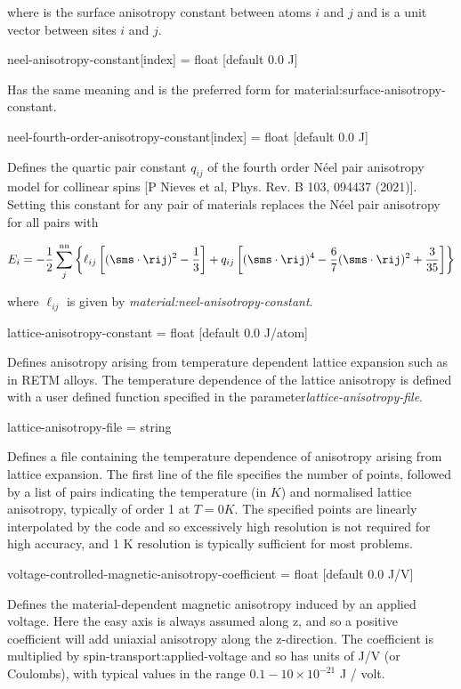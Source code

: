 \noindent where \ksurf is the surface anisotropy constant between atoms $i$ and $j$ and \rij is a unit vector between sites $i$ and $j$.

{\zicf neel-anisotropy-constant[index] = float [default 0.0 J]}
Has the same meaning and is the preferred form for material:surface-anisotropy-constant.

{\zicf neel-fourth-order-anisotropy-constant[index] = float [default 0.0 J]}
Defines the quartic pair constant $q_{ij}$ of the fourth order N\'eel pair anisotropy model for collinear spins [P Nieves et al, Phys. Rev. B 103, 094437 (2021)]. Setting this constant for any pair of materials replaces the N\'eel pair anisotropy for all pairs with

\begin{equation*}
E_i = -\frac{1}{2} \sum_j^{\mathrm{nn}} \left\{ \ell_{ij} \left[ (\sms \cdot \rij )^2 - \frac{1}{3} \right] + q_{ij} \left[ (\sms \cdot \rij )^4 - \frac{6}{7} (\sms \cdot \rij )^2 + \frac{3}{35} \right] \right\}
\end{equation*}

\noindent where $\ell_{ij}$ is given by \textit{material:neel-anisotropy-constant}.

{\zicf lattice-anisotropy-constant = float [default 0.0 J/atom]}
Defines anisotropy arising from temperature dependent lattice expansion such as in RETM alloys. The temperature dependence of the lattice anisotropy is defined with a user defined function specified in the parameter\textit{lattice-anisotropy-file}.

{\zicf lattice-anisotropy-file = string} Defines a file containing the temperature dependence of anisotropy arising from lattice expansion. The first line of the file specifies the number of points, followed by a list of pairs indicating the temperature (in $K$) and normalised lattice anisotropy, typically of order 1 at $T = 0 K$. The specified points are
linearly interpolated by the code and so excessively high resolution is not required for high accuracy, and 1 K resolution is typically sufficient for most problems.

{\zicf voltage-controlled-magnetic-anisotropy-coefficient = float [default 0.0 J/V]}
Defines the material-dependent magnetic anisotropy induced by an applied voltage.
Here the easy axis is always assumed along z, and so a positive coefficient will
add uniaxial anisotropy along the z-direction. The coefficient is multiplied by
spin-transport:applied-voltage and so has units of J/V (or Coulombs), with typical
values in the range $0.1-10 \times 10^{-21}$ J / volt.

